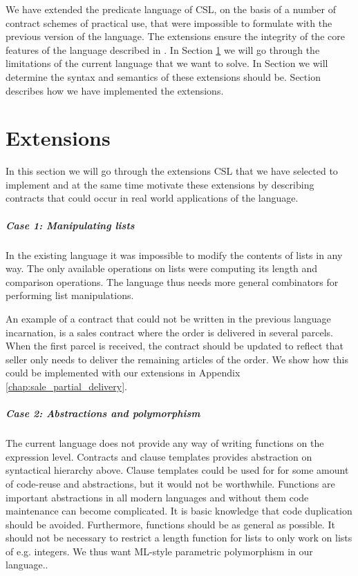 \documentclass[10pt,a4paper,final,oneside,openany,article]{memoir}
\begin{document}
We have extended the predicate language of CSL, on the basis of a
number of contract schemes of practical use, that were impossible to
formulate with the previous version of the language. The extensions
ensure the integrity of the core features of the language described in
\cite{hvitved10}.  In Section \ref{extensions} we will go through the
limitations of the current language that we want to solve. In Section
we will determine the syntax and semantics of these extensions should
be. Section
\label{implementation} describes how we have implemented the
extensions.

\chapter{Extensions}
\label{extensions}
In this section we will go through the extensions CSL that we have
selected to implement and at the same time motivate these extensions
by describing contracts that could occur in real world applications of
the language.

\paragraph{Case 1: Manipulating lists} In the existing language it was
impossible to modify the contents of lists in any way. The only
available operations on lists were computing its length and comparison
operations. The language thus needs more general combinators for
performing list manipulations.

An example of a contract that could not be written in the previous
language incarnation, is a sales contract where the order is delivered
in several parcels. When the first parcel is received, the contract
should be updated to reflect that seller only needs to deliver the
remaining articles of the order.  We show how this could be
implemented with our extensions in Appendix
\ref{chap:sale_partial_delivery}.

\paragraph{Case 2: Abstractions and polymorphism} The current language
does not provide any way of writing functions on the expression
level. Contracts and clause templates provides abstraction on
syntactical hierarchy above. Clause templates could be used for for
some amount of code-reuse and abstractions, but it would not be
worthwhile. Functions are important abstractions in all modern
languages and without them code maintenance can become complicated. It
is basic knowledge that code duplication should be avoided.
Furthermore, functions should be as general as possible. It should not
be necessary to restrict a length function for lists to only work on
lists of e.g. integers. We thus want ML-style parametric polymorphism
in our language..
\end{document}
